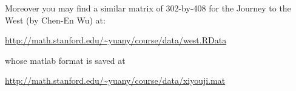 \documentclass[11pt]{article}
\begin{document}
%

Moreover you may find a similar matrix of 302-by-408 for the Journey to the West (by Chen-En Wu) at:

\url{http://math.stanford.edu/~yuany/course/data/west.RData}

\noindent whose matlab format is saved at

\url{http://math.stanford.edu/~yuany/course/data/xiyouji.mat}



%
%
% 
%
%
%
%
%
%
\end{document}
